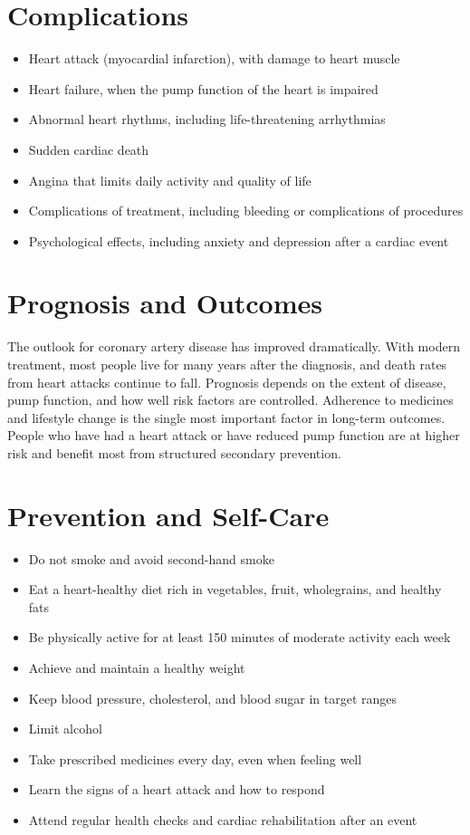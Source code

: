 \section*{Complications}
\begin{itemize}
    \item Heart attack (myocardial infarction), with damage to heart muscle
    \item Heart failure, when the pump function of the heart is impaired
    \item Abnormal heart rhythms, including life-threatening arrhythmias
    \item Sudden cardiac death
    \item Angina that limits daily activity and quality of life
    \item Complications of treatment, including bleeding or complications of procedures
    \item Psychological effects, including anxiety and depression after a cardiac event
\end{itemize}

\section*{Prognosis and Outcomes}
The outlook for coronary artery disease has improved dramatically. With modern treatment, most people live for many years after the diagnosis, and death rates from heart attacks continue to fall. Prognosis depends on the extent of disease, pump function, and how well risk factors are controlled. Adherence to medicines and lifestyle change is the single most important factor in long-term outcomes. People who have had a heart attack or have reduced pump function are at higher risk and benefit most from structured secondary prevention.

\section*{Prevention and Self-Care}
\begin{itemize}
    \item Do not smoke and avoid second-hand smoke
    \item Eat a heart-healthy diet rich in vegetables, fruit, wholegrains, and healthy fats
    \item Be physically active for at least 150 minutes of moderate activity each week
    \item Achieve and maintain a healthy weight
    \item Keep blood pressure, cholesterol, and blood sugar in target ranges
    \item Limit alcohol
    \item Take prescribed medicines every day, even when feeling well
    \item Learn the signs of a heart attack and how to respond
    \item Attend regular health checks and cardiac rehabilitation after an event
\end{itemize}

